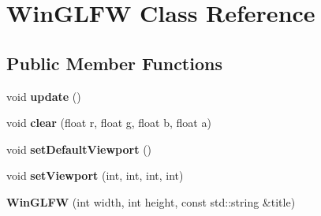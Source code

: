 \hypertarget{classWinGLFW}{\section{Win\-G\-L\-F\-W Class Reference}
\label{classWinGLFW}
}
\subsection*{Public Member Functions}
\begin{DoxyCompactItemize}
\item 
\hypertarget{classWinGLFW_a0432cd995b3b6a527e96bee7b1e74f03}{void {\bfseries update} ()}\label{classWinGLFW_a0432cd995b3b6a527e96bee7b1e74f03}

\item 
\hypertarget{classWinGLFW_a7d5fae9072906870241b859ceffbd9c1}{void {\bfseries clear} (float r, float g, float b, float a)}\label{classWinGLFW_a7d5fae9072906870241b859ceffbd9c1}

\item 
\hypertarget{classWinGLFW_a86b542f7d8fae5ac2d8968fc9598eceb}{void {\bfseries set\-Default\-Viewport} ()}\label{classWinGLFW_a86b542f7d8fae5ac2d8968fc9598eceb}

\item 
\hypertarget{classWinGLFW_a9370824de27680c05cc5a028c0ad2d0a}{void {\bfseries set\-Viewport} (int, int, int, int)}\label{classWinGLFW_a9370824de27680c05cc5a028c0ad2d0a}

\item 
\hypertarget{classWinGLFW_a961e02726e197190610c0229f9fea53d}{{\bfseries Win\-G\-L\-F\-W} (int width, int height, const std\-::string \&title)}\label{classWinGLFW_a961e02726e197190610c0229f9fea53d}

\end{DoxyCompactItemize}
